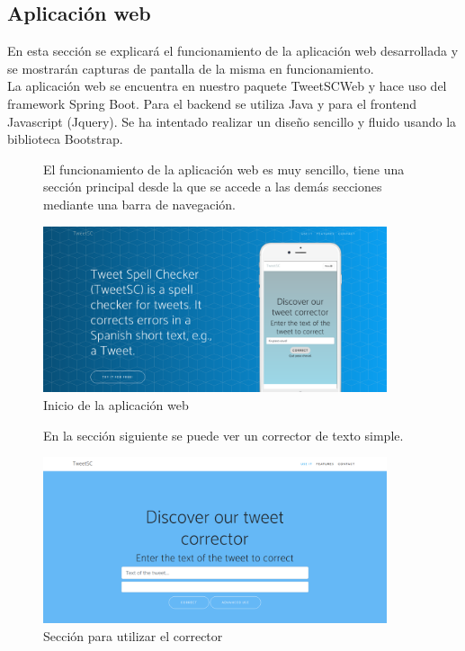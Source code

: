 \documentclass[spanish,12pt, a4paper,twoside]{paper}
\begin{document}
\subsection{Aplicación web}\label{sec:aplicacionweb}
En esta sección se explicará el funcionamiento de la aplicación web desarrollada y se mostrarán capturas de pantalla de la misma en funcionamiento.\\

La aplicación web se encuentra en nuestro paquete TweetSCWeb y hace uso del framework Spring Boot. Para el backend se utiliza Java y para el frontend Javascript (Jquery). Se ha intentado realizar un diseño sencillo y fluido usando la biblioteca Bootstrap.\\

\begin{figure}[h]
El funcionamiento de la aplicación web es muy sencillo, tiene una sección principal desde la que se accede a las demás secciones mediante una barra de navegación.
\begin{center}
 \includegraphics[width=0.9\textwidth]{recursos/WebInicio.png}
\caption{Inicio de la aplicación web}
\label{fig:webinicio}
\end{center}
\end{figure}

\begin{figure}[h]
En la sección siguiente se puede ver un corrector de texto simple.
\begin{center}
\includegraphics[width=0.9\textwidth]{recursos/WebUseIt.png}
\caption{Sección para utilizar el corrector}
\label{fig:webuseit}
\end{center}
\end{figure}
\end{document}
